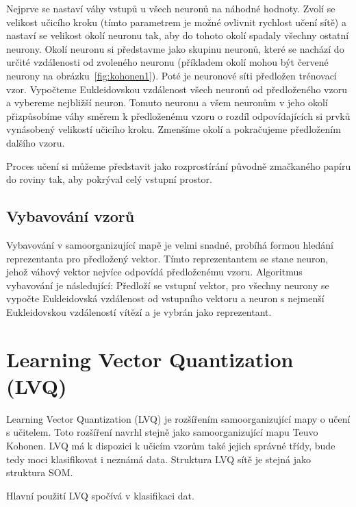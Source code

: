 \documentclass[11pt,twoside,a4paper]{book}
\begin{document}
Nejprve se nastaví váhy vstupů u všech neuronů na náhodné hodnoty. Zvolí se velikost učicího kroku (tímto parametrem je možné ovlivnit rychlost učení sítě) a nastaví se velikost okolí neuronu tak, aby do tohoto okolí spadaly všechny ostatní neurony. Okolí neuronu si představme jako skupinu neuronů, které se nachází do určité vzdálenosti od zvoleného neuronu (příkladem okolí mohou být červené neurony na obrázku~\ref{fig:kohonen1}). Poté je neuronové síti předložen trénovací vzor. Vypočteme Eukleidovskou vzdálenost všech neuronů od předloženého vzoru a vybereme nejbližší neuron. Tomuto neuronu a všem neuronům v jeho okolí přizpůsobíme váhy směrem k předloženému vzoru o rozdíl odpovídajících si prvků vynásobený velikostí učicího kroku. Zmenšíme okolí a pokračujeme předložením dalšího vzoru.

Proces učení si můžeme představit jako rozprostírání původně zmačkaného papíru do roviny tak, aby pokrýval celý vstupní prostor.
\subsection{Vybavování vzorů}
Vybavování v samoorganizující mapě je velmi snadné, probíhá formou hledání reprezentanta pro předložený vektor. Tímto reprezentantem se stane neuron, jehož váhový vektor nejvíce odpovídá předloženému vzoru. Algoritmus vybavování je následující: Předloží se vstupní vektor, pro všechny neurony se vypočte Eukleidovská vzdálenost od vstupního vektoru a neuron s nejmenší Eukleidovskou vzdáleností vítězí a je vybrán jako reprezentant.
\section{Learning Vector Quantization (LVQ)}
Learning Vector Quantization (LVQ) je rozšířením samoorganizující mapy o učení s učitelem. Toto rozšíření navrhl stejně jako samoorganizující mapu Teuvo Kohonen. LVQ má k dispozici k učicím vzorům také jejich správné třídy, bude tedy moci klasifikovat i neznámá data. Struktura LVQ sítě je stejná jako struktura SOM.

Hlavní použití LVQ spočívá v klasifikaci dat.
\end{document}
